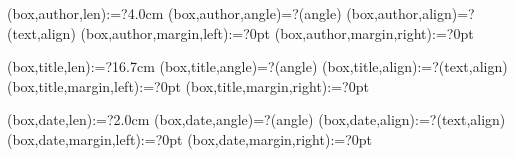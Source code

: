 \spine(box,author,len):=?{4.0cm}
\spine(box,author,angle)=?{\thespine(angle)}
\spine(box,author,align)=?{\thespine(text,align)}
\spine(box,author,margin,left):=?{0pt}
\spine(box,author,margin,right):=?{0pt}

\spine(box,title,len):=?{16.7cm}
\spine(box,title,angle)=?{\thespine(angle)}
\spine(box,title,align):=?{\thespine(text,align)}
\spine(box,title,margin,left):=?{0pt}
\spine(box,title,margin,right):=?{0pt}

\spine(box,date,len):=?{2.0cm}
\spine(box,date,angle)=?{\thespine(angle)}
\spine(box,date,align):=?{\thespine(text,align)}
\spine(box,date,margin,left):=?{0pt}
\spine(box,date,margin,right):=?{0pt}



\newif\ifisdim
\newcommand{\@setifisdim}[1]{%
  \StrLeft{#1}{1}[\@dimleft]%
  \StrRight{#1}{1}[\@dimright]%
  \IfInteger{\@dimleft}{%
    \IfInteger{\@dimright}{%
      \isdimfalse%
    }{%
      \isdimtrue%
    }%
  }{%
    \isdimfalse%
  }%
}
\newcommand{\IfIsDim}[3]{%
  \@setifisdim{#1}%
  \ifisdim#2\else#3\fi%
}

%

\newdimen\@spinelen  %
\newcommand{\@checkspinelen}[1][\paperheight]{%
  \@tempdima=\thespine(margin,left)\relax%
  \@tempdimb=\thespine(margin,right)\relax%
  \DEBUG{SPINELEN MARGIN [left] = \the\@tempdima}%
  \DEBUG{SPINELEN MARGIN [right] = \the\@tempdimb}%
  \@tempdima=\dimexpr\@tempdima+\@tempdimb\relax%
  \DEBUG{SPINELEN ACCUMULATED = \the\@tempdima}%
  \StrCount{\thespine(order)}{,}[\@nBoxSep]%
  \@for\myi:=\expanded{\thespine(order)}\do{%
    \DEBUG{SPINELEN BOXLEN [\myi]}%
    \@tempdimb=\thespine(box,\myi,len)\relax%
    \DEBUG{SPINELEN BOXLEN [\myi] = \the\@tempdimb}%
    \@tempdima=\dimexpr\@tempdima+\@tempdimb\relax%
    \DEBUG{SPINELEN ACCUMULATED = \the\@tempdima}%
  }
  \DEBUG{SPINELEN MAX = \the#1}%
  \@spinelen=\@tempdima%
}


\newcommand{\@reverelist}[2]{%
  \def\@rvstmp{}%
  \@for\myi:={#1}\do{%
    \epreto\@rvstmp{,\myi}%
  }%
  \edef\@rvstmp{\expandafter\@gobble\@rvstmp}%
  \edef#2{\@rvstmp}%
}


